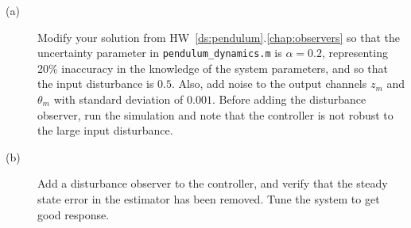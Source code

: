\begin{description}
\item[(a)] Modify your solution from HW~\ref{ds:pendulum}.\ref{chap:observers} so
that the uncertainty parameter in {\tt  pendulum\_dynamics.m} is $\alpha=0.2$, representing 20\% inaccuracy in the knowledge of the system parameters, and so that the input disturbance is $0.5$. Also, add noise to the output channels $z_m$ and $\theta_m$ with standard deviation of $0.001$.  Before adding the disturbance observer, run the simulation and note that the controller is not robust to the large input disturbance.
\item[(b)] Add a disturbance observer to the controller, and verify that the steady state error in the estimator has been removed.  Tune the system to get good response.
\end{description}
